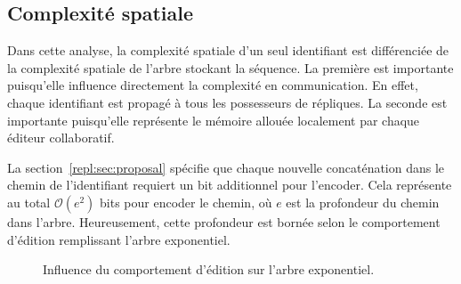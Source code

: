 \subsection{Complexité spatiale}
\label{repl:subsec:space}

Dans cette analyse, la complexité spatiale d'un seul identifiant est
différenciée de la complexité spatiale de l'arbre stockant la séquence. La
première est importante puisqu'elle influence directement la complexité en
communication. En effet, chaque identifiant est propagé à tous les possesseurs
de répliques. La seconde est importante puisqu'elle représente le mémoire allouée
localement par chaque éditeur collaboratif.

La section~\ref{repl:sec:proposal} spécifie que chaque nouvelle concaténation
dans le chemin de l'identifiant requiert un bit additionnel pour l'encoder. Cela
représente au total $\mathcal{O}(e^2)$ bits pour encoder le chemin, où $e$ est
la profondeur du chemin dans l'arbre. Heureusement, cette profondeur est bornée
selon le comportement d'édition remplissant l'arbre exponentiel. 

\begin{figure}
  \begin{center}
    \hspace{10pt}
    \hspace{10pt}
    \caption[Influence du comportement d'édition sur l'arbre exponentiel]
    {Influence du comportement d'édition sur l'arbre exponentiel.}
  \end{center}
\end{figure}


